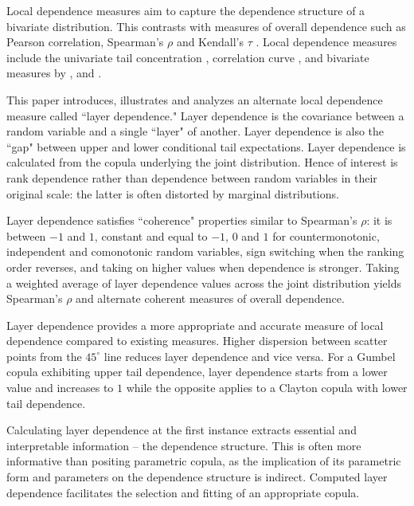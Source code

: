 \documentclass[authoryear]{elsarticle}
\begin{document}
Local dependence measures aim to capture the dependence structure of a bivariate distribution. This contrasts with  measures of overall dependence such as Pearson correlation, Spearman's $\rho$ and Kendall's $\tau$ \citep{embrechts2002correlation}. Local dependence measures include the univariate tail concentration \citep{venter2002tails}, correlation curve \citep{bjerve1993correlation}, and bivariate measures by \cite{bairamov2003new}, \cite{jones1996local} and \cite{holland1987dependence}.

This paper introduces, illustrates and analyzes an alternate local dependence measure called  ``layer dependence." Layer dependence is the covariance between a random variable and a single ``layer" of another. Layer dependence is also the ``gap" between upper and lower conditional tail expectations. Layer dependence is calculated  from the copula underlying the joint distribution.  Hence of interest is rank dependence rather than dependence between random variables in their original scale: the latter is often distorted by marginal distributions.


Layer dependence satisfies ``coherence" properties similar to Spearman's $\rho$: it is between $-1$ and $1$, constant and equal to $-1$, $0$ and $1$ for countermonotonic, independent and comonotonic random variables, sign switching when the ranking order reverses, and taking on higher values when dependence is stronger. Taking a weighted average of layer dependence values across the joint distribution yields Spearman's $\rho$ and alternate coherent measures of overall dependence.

Layer dependence provides a more appropriate and accurate measure of local dependence compared to existing measures. Higher dispersion between scatter points from the $45^\circ$ line reduces layer dependence and vice versa. For a Gumbel copula exhibiting upper tail dependence, layer dependence starts from a lower value and increases to $1$ while the opposite applies to a Clayton copula with lower tail dependence.

Calculating layer dependence at the first instance extracts essential and interpretable information -- the dependence structure. This is often more informative than positing parametric copula, as the implication of its parametric form and parameters on the dependence structure is indirect. Computed layer dependence facilitates the selection and fitting of an appropriate copula.
\end{document}
